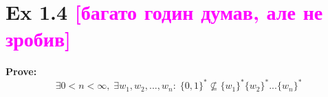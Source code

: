 \section*{Ex 1.4 \textcolor{magenta}{[багато годин думав, але не зробив]}}
\begin{mdframed}
	\textbf{Prove:}
	$$\exists 0<n<\infty,\; \exists w_1,w_2,..., w_n :\; \{0,1\}^* \nsubseteq \{w_1\}^*\{w_2\}^*...\{w_n\}^*$$
\end{mdframed}





